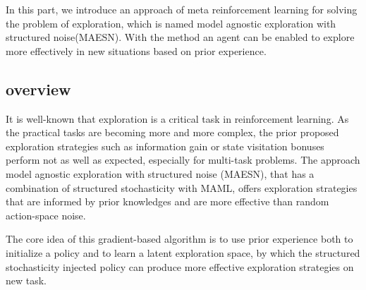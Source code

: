 In this part, we introduce an approach of meta reinforcement learning for solving the problem of exploration, which is named model agnostic exploration with structured noise(MAESN). With the method an agent can be enabled to explore more effectively in new situations based on prior experience.
\subsection{overview}
It is well-known that exploration is a critical task in reinforcement learning. As the practical tasks are becoming more and more complex, the prior proposed exploration strategies such as information gain or state visitation bonuses perform not as well as expected, especially for multi-task problems. The approach model agnostic exploration with structured noise (MAESN), that has a combination of structured stochasticity with MAML, offers exploration strategies that are informed by prior knowledges and are more effective than random action-space noise.

The core idea of this gradient-based algorithm is to use prior experience both to initialize a policy and to learn a latent exploration space, by which the structured stochasticity injected policy can produce more effective exploration strategies on new task.

